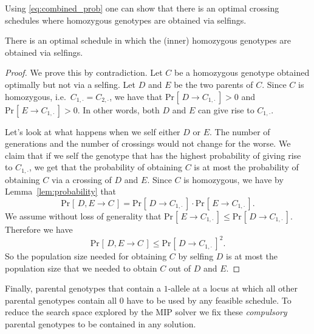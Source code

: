 \documentclass[runningheads]{llncs}
\renewcommand{\Pr}[2][]{\mathrm{Pr}_{#1} [\, #2 \, ]}
\begin{document}
Using \eqref{eq:combined_prob} one can show that there is an optimal crossing schedules where homozygous genotypes are obtained via selfings. 
\begin{lemma}
\label{lem:selfing}
There is an optimal schedule in which the (inner) homozygous genotypes are obtained via selfings.
\end{lemma}
\begin{proof}
We prove this by contradiction. Let $C$ be a homozygous genotype obtained
optimally but not via a selfing. Let $D$ and $E$ be the two parents of $C$.
Since $C$ is homozygous, i.e.\ $C_{1,\cdot} = C_{2,\cdot}$, we have that $\Pr{D \rightarrow
C_{1,\cdot}} > 0$ and $\Pr{E \rightarrow C_{1,\cdot}} > 0$. In other words, both $D$ and $E$ can
give rise to $C_{1,\cdot}$.

Let's look at what happens when we self either $D$ or $E$. The number of
generations and the number of crossings would not change for the worse. 
We claim that if we self the genotype that has the highest probability of 
giving rise to $C_{1,\cdot}$, we get that the probability of obtaining $C$ is at most the probability of obtaining $C$ via a crossing of $D$ and $E$.
Since $C$ is homozygous, we have by Lemma~\ref{lem:probability} that
\[
\Pr{D,E \rightarrow C} = \Pr{D \rightarrow C_{1,\cdot}} \cdot \Pr{E \rightarrow C_{1,\cdot}}.
\]
We assume without loss of generality that $\Pr{E \rightarrow C_{1,\cdot}} \leq \Pr{D \rightarrow C_{1,\cdot}}$. Therefore we have
\[
\Pr{D,E \rightarrow C} \leq \Pr{D \rightarrow C_{1,\cdot}}^2.
\]
So the population size needed for obtaining $C$ by selfing $D$ is at most the
population size that we needed to obtain $C$ out of $D$ and $E$. 
\end{proof}


Finally, parental genotypes that contain a $1$-allele at a locus at which all other parental genotypes contain all $0$ have to be used by any feasible schedule. To reduce the search space explored by the MIP solver we fix these \emph{compulsory} parental genotypes to be contained in any solution.
\end{document}
